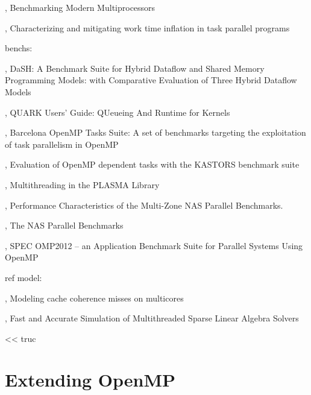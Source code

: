 \cite{Bienia2011}, Benchmarking Modern Multiprocessors

\cite{Olivier2013}, Characterizing and mitigating work time inflation in task parallel programs

benchs:

\cite{Gajinov2014}, DaSH: A Benchmark Suite for Hybrid Dataflow and Shared Memory Programming Models: with Comparative Evaluation of Three Hybrid Dataflow Models

\cite{YarKhan2011}, QUARK Users' Guide: QUeueing And Runtime for Kernels

\cite{Duran2009}, Barcelona OpenMP Tasks Suite: A set of benchmarks targeting the exploitation of task parallelism in OpenMP

\cite{Virouleau2014}, Evaluation of OpenMP dependent tasks with the KASTORS benchmark suite

\cite{Kurzak2013}, Multithreading in the PLASMA Library

\cite{Jin2004}, Performance Characteristics of the Multi-Zone NAS Parallel Benchmarks.

\cite{Bailey1994}, The NAS Parallel Benchmarks

\cite{Muller2012}, SPEC OMP2012 -- an Application Benchmark Suite for Parallel Systems Using OpenMP


ref model:

\cite{Pan2014}, Modeling cache coherence misses on multicores

\cite{Stanisic2016}, Fast and Accurate Simulation of Multithreaded Sparse Linear Algebra Solvers





\begin{savequote}[6cm]
<< truc
\end{savequote}

\chapter{Extending OpenMP}\label{chap:contrib:TODO}
\chaptertoc


%

